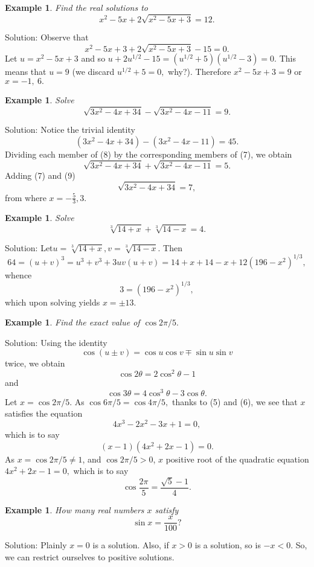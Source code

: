 \documentclass[11pt, openany]{book}
\theoremstyle{change} \theoremheaderfont{\blue\sffamily\bfseries}
\newtheorem{exa}[thm]{Example}
\theoremstyle{nonumberplain} \theoremheaderfont{\sffamily\bfseries}
\newcommand{\í}{\'{\i}}
\begin{document}
\begin{exa} Find the real solutions to $$x^2 - 5x + 2\sqrt{x^2 - 5x + 3} = 12.$$ \end{exa}
Solution: Observe that $$x^2 - 5x + 3 + 2\sqrt{x^2 - 5x + 3} - 15
= 0.$$ Let $u = x^2 - 5x + 3$  and so $u + 2u^{1/2} - 15 =
(u^{1/2} + 5)(u^{1/2} - 3) = 0$. This means that $u = 9$ (we
discard $u^{1/2} + 5 = 0,$ why?). Therefore $x^2 - 5x + 3 = 9$ or
$x = -1,\ 6.$
\begin{exa} Solve \begin{equation}\sqrt{3x^2 - 4x + 34} - \sqrt{3x^2 - 4x - 11} = 9.\end{equation}\end{exa}
Solution: Notice the trivial identity
\begin{equation} (3x^2 - 4x + 34) - (3x^2 - 4x - 11) = 45. \end{equation}
Dividing each member of (8) by the corresponding members of (7),
we  obtain
\begin{equation}
\sqrt{3x^2 - 4x + 34} + \sqrt{3x^2 - 4x - 11} = 5.
\end{equation}
Adding (7) and (9) $$\sqrt{3x^2 - 4x + 34} = 7,$$from where $x =
-\frac{5}{3}, 3.$
\begin{exa} Solve
$$\sqrt[3]{14 + x} + \sqrt[3]{14 - x} =  4.$$\end{exa}
Solution: Let$u = \sqrt[3]{14 + x}, v = \sqrt[3]{14 - x}.$ Then
$$64 = (u + v)^3 = u^3 + v^3 + 3uv(u + v) = 14 + x + 14 - x + 12(196 - x^2)^{1/3}, $$whence
$$3 = (196 - x^2)^{1/3}, $$which upon solving yields $x = \pm 13.$
\begin{exa}  Find the exact value of $\cos 2\pi/5.$\end{exa}
Solution: Using the identity
$$\cos (u \pm v) = \cos u\cos v \mp \sin u\sin v$$twice, we obtain
\begin{equation}\cos 2\theta = 2\cos ^2\theta - 1\end{equation}and
\begin{equation}\cos 3\theta = 4\cos ^3 \theta - 3\cos \theta .\end{equation}
Let $x = \cos 2\pi /5.$ As $\cos 6\pi /5 = \cos 4\pi /5,$ thanks
to  (5) and (6), we see that $x$ satisfies the equation
$$4x^3 - 2x^2 - 3x + 1 = 0,$$which is to say $$(x - 1)(4x^2 + 2x - 1) =  0.$$
As $x = \cos 2\pi /5 \neq 1$, and  $\cos 2\pi /5 > 0$, $x$
positive root of the quadratic equation $4x^2 + 2x - 1 = 0,$ which
is to say
$$\cos \frac{2\pi}{5} = \frac{\sqrt{5} - 1}{4}.$$
\begin{exa} How many real numbers $x$ satisfy
$$\sin x = \frac{x}{100} ?$$\end{exa}
Solution: Plainly $x = 0$ is a solution. Also, if $x > 0$ is a
solution, so is $-x < 0$. So, we can restrict ourselves to
positive solutions.
\end{document}
